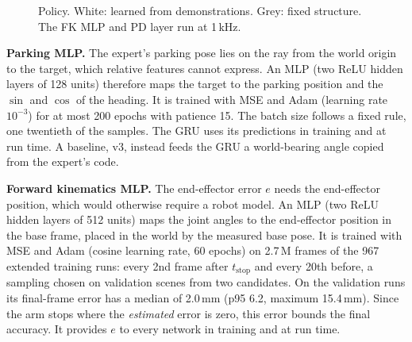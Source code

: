 \documentclass[conference]{IEEEtran}
\begin{document}
\begin{figure}[H]
\centering
{}
\caption{Policy. White: learned from demonstrations. Grey: fixed structure.
The FK MLP and PD layer run at 1\,kHz.}
\label{fig:arch}
\end{figure}

\textbf{Parking MLP.} The expert's parking pose lies on the ray from the world origin to the target, which
relative features cannot express. An MLP (two ReLU hidden layers of 128 units) therefore maps the target to the
parking position and the $\sin$ and $\cos$ of the heading. It is trained with MSE and Adam (learning rate
$10^{-3}$) for at most 200 epochs with patience 15. The batch size follows a fixed rule, one twentieth of the
samples. The GRU uses its predictions in training and at run time. A baseline, v3, instead feeds the GRU a
world-bearing angle copied from the expert's code.

\textbf{Forward kinematics MLP.} The end-effector error $e$ needs the end-effector position, which would otherwise
require a robot model. An MLP (two ReLU hidden layers of 512 units) maps the joint angles to the end-effector
position in the base frame, placed in the world by the measured base pose. It is trained with MSE and Adam
(cosine learning rate, 60 epochs) on 2.7\,M frames of the 967 extended training runs: every 2nd frame after
$t_\text{stop}$ and every 20th before, a sampling chosen on validation scenes from two candidates. On the
validation runs its final-frame error has a median of 2.0\,mm (p95 6.2, maximum 15.4\,mm). Since the arm stops
where the \emph{estimated} error is zero, this error bounds the final accuracy. It provides $e$ to every network
in training and at run time.
\end{document}
